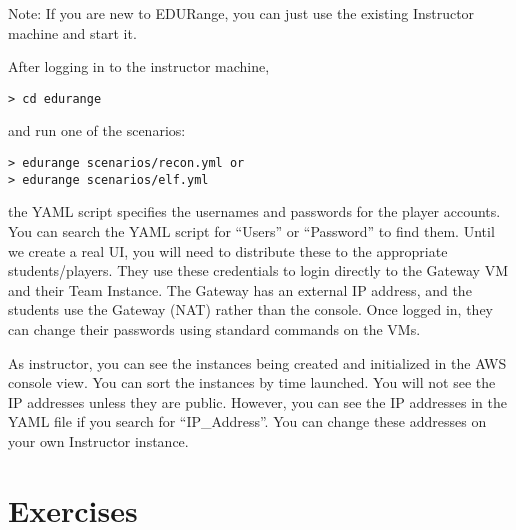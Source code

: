 \documentclass[11pt]{report}
\newcommand{\eat}[1]{}
\begin{document}
{    Note: If you are new to EDURange, you can just use the existing Instructor machine and start it.
     \eat{The instances are on the US East cloud (N Virginia).  You can switch to 
    that in the drop down in the upper right of the window next to your name.  Then, you can
    click on running instances (there should be 0) under Resources.  }
  \item After logging in to the instructor machine, 
\begin{verbatim}
> cd edurange
\end{verbatim}
and run one of the scenarios:
\begin{verbatim}
> edurange scenarios/recon.yml or
> edurange scenarios/elf.yml 
\end{verbatim}
\item the YAML script specifies the usernames and passwords for the player accounts.  
You can search the YAML script for ``Users'' or ``Password'' to find them.  Until we create a real UI,
you will need to distribute these to the appropriate students/players.  They use these credentials
to login directly to the Gateway VM and their Team Instance.  The Gateway has an external IP address,
and the students use the Gateway (NAT) rather than the console.
 Once logged in, they can 
change their passwords using standard commands on the VMs.
\item As instructor, you can see the instances being created and initialized in the AWS console view.  
  You can sort the instances by time launched.  You will not see the IP addresses unless
  they are public.  However, you can see the IP addresses in the YAML file if you search
  for ``IP\_Address''.  You can change these addresses on your own Instructor instance.  
}



\section{Exercises}
\end{document}
